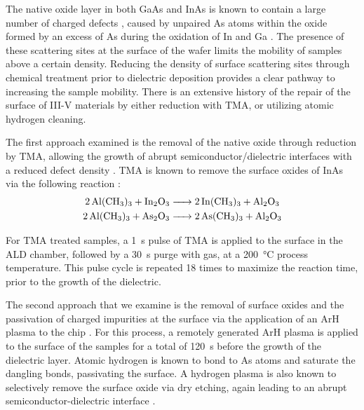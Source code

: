 The native oxide layer in both GaAs and InAs is known to contain a large number of charged defects \cite{doi:10.1063/1.5054292,PhysRevB.49.11159}, caused by unpaired As atoms within the oxide formed by an excess of As during the oxidation of In and Ga \cite{doi:10.1063/1.3369540,Affentauschegg_2001}. The presence of these scattering sites at the surface of the wafer limits the mobility of samples above a certain density. Reducing the density of surface scattering sites through chemical treatment prior to dielectric deposition provides a clear pathway to increasing the sample mobility. There is an extensive history of the repair of the surface of III-V materials by either reduction with TMA, or utilizing atomic hydrogen cleaning.

The first approach examined is the removal of the native oxide through reduction by TMA, allowing the growth of abrupt semiconductor/dielectric interfaces with a reduced defect density \cite{doi:10.1063/1.3148723,Tallarida_2012,CLEVELAND2013167}.
TMA is known to remove the surface oxides of InAs via the following reaction \cite{iiiv_cleanup}:
\begin{align}
    \ce{2Al(CH3)3 + In2O3 &-> 2In(CH3)3 + Al2O3} \\
    \ce{2Al(CH3)3 + As2O3 &-> 2As(CH3)3 + Al2O3}
\end{align}

For TMA treated samples, a \SI{1}{\second} pulse of TMA is applied to the surface in the ALD chamber, followed by a \SI{30}{\second} purge with  gas, at a \SI{200}{\celsius} process temperature. This pulse cycle is repeated 18 times to maximize the reaction time, prior to the growth of the dielectric.

The second approach that we examine is the removal of surface oxides and the passivation of charged impurities at the surface via the application of an ArH plasma to the chip \cite{CLEVELAND2013167,BELL1998125,doi:10.1116/1.586538}. For this process, a remotely generated ArH plasma is applied to the surface of the samples for a total of \SI{120}{\second} before the growth of the dielectric layer. Atomic hydrogen is known to bond to As atoms and saturate the dangling bonds, passivating the surface. A hydrogen plasma is also known to selectively remove the surface oxide via dry etching, again leading to an abrupt semiconductor-dielectric interface \cite{doi:10.1063/1.92194,doi:10.1063/1.100961}.

